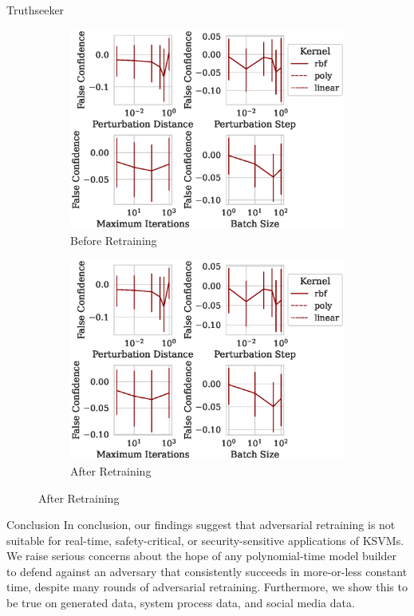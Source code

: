 \documentclass{beamer}
\begin{document}
\begin{frame}{Truthseeker}
\begin{figure}
\begin{subfigure}{0.4\textwidth}
         \centering
         \includegraphics[width=\textwidth]{./truthseeker/confidence_vs_attack_parameters.eps}
         \caption{Before Retraining}
     \end{subfigure}
     \hfill
     \begin{subfigure}{0.4\textwidth}
         \centering
         \includegraphics[width=\textwidth]{./truthseeker/retrain_confidence_vs_attack_parameters.eps}
         \caption{After Retraining}
     \end{subfigure}
     \hfill
     \label{fig:truthseeker}
\end{figure}
\end{frame}

\begin{frame}{Conclusion}
  In conclusion, our findings suggest that adversarial retraining is not suitable for real-time, safety-critical, or security-sensitive applications of KSVMs. We raise serious concerns about the hope of any polynomial-time model builder to defend against an adversary that consistently succeeds in more-or-less constant time, despite many rounds of adversarial retraining. Furthermore, we show this to be true on generated data, system process data, and social media data.
\end{frame}
\end{document}
